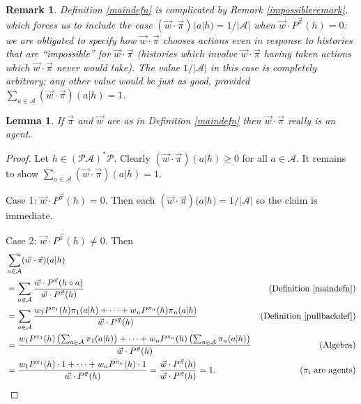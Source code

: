 \documentclass[twoside]{article}
\newtheorem{remark}[theorem]{Remark}
\newtheorem{lemma}[theorem]{Lemma}
\begin{document}
\begin{remark}
    Definition \ref{maindefn} is complicated by Remark \ref{impossibleremark},
    which forces us to include the case
    $(\vec w\cdot\vec\pi)(a|h)=1/|\mathcal A|$ when
    $\vec w\cdot {P^{\vec\pi}}(h)=0$: we are obligated to specify how
    $\vec w\cdot\vec\pi$ chooses actions even in response to histories that
    are ``impossible'' for $\vec w\cdot\vec\pi$ (histories which involve
    $\vec w\cdot\vec\pi$ having taken actions which $\vec w\cdot\vec\pi$
    never would take). The value $1/|\mathcal A|$ in this case is completely arbitrary;
    any other value would be just as good,
    provided $\sum_{a\in\mathcal A}(\vec w\cdot\vec\pi)(a|h)=1$.
\end{remark}

\begin{lemma}
    If $\vec\pi$ and $\vec w$ are as in Definition \ref{maindefn}
    then $\vec w\cdot\vec\pi$ really is an agent.
\end{lemma}

\begin{proof}
    Let $h\in(\mathcal P\mathcal A)^*\mathcal P$.
    Clearly $(\vec w\cdot\vec\pi)(a|h)\geq 0$ for all $a\in\mathcal A$.
    It remains to show
    $\sum_{a\in\mathcal A}(\vec w\cdot\vec\pi)(a|h)=1$.

    Case 1: $\vec w\cdot {P^{\vec\pi}}(h)=0$. Then
    each $(\vec w\cdot\vec\pi)(a|h)=1/|\mathcal A|$ so the
    claim is immediate.

    Case 2: $\vec w\cdot {P^{\vec\pi}}(h)\not=0$. Then
    \begin{align*}
        &{} \sum_{a\in\mathcal A}(\vec w\cdot\vec\pi)(a|h)\\
            &= \sum_{a\in\mathcal A}
                \frac{\vec w\cdot {P^{\vec\pi}}(h\circ a)}{\vec w\cdot {P^{\vec\pi}}(h)}
                &\mbox{(Definition \ref{maindefn})}\\
            &= \sum_{a\in\mathcal A}
                \frac
                {w_1 P^{\pi_1}(h)\pi_1(a|h)+\cdots+w_n P^{\pi_n}(h)\pi_n(a|h)}
                {\vec w\cdot {P^{\vec\pi}}(h)}
                &\mbox{(Definition \ref{pullbackdef})}\\
            &= \frac{
                w_1 P^{\pi_1}(h)\left(\mbox{$\sum_{a\in\mathcal A}\pi_1(a|h)$}\right)
                +\cdots+
                w_n P^{\pi_n}(h)\left(\mbox{$\sum_{a\in\mathcal A}\pi_n(a|h)$}\right)
                }
                {\vec w\cdot {P^{\vec\pi}}(h)}
                &\mbox{(Algebra)}\\
            &= \frac
                {w_1 P^{\pi_1}(h)\cdot 1 + \cdots + w_n P^{\pi_n}(h)\cdot1}
                {\vec w\cdot {P^{\vec\pi}}(h)}
                =\frac{\vec w\cdot {P^{\vec\pi}}(h)}{\vec w\cdot {P^{\vec\pi}}(h)}=1.
                &\mbox{($\pi_i$ are agents)}
    \end{align*}
\end{proof}
\end{document}
